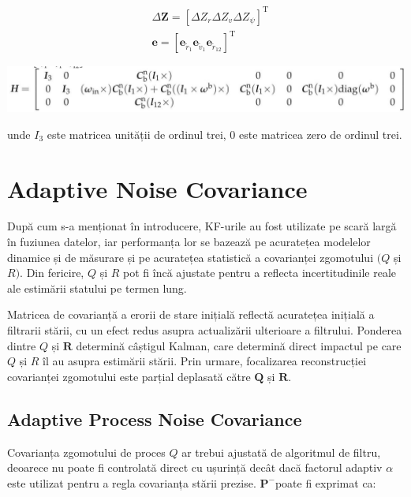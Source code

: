 \documentclass[10pt]{report}
\begin{document}
\begin{equation}
  \begin{aligned}
     & \Delta \mathbf{Z}=\left[\Delta Z_{r} \Delta Z_{v} \Delta Z_{\psi}\right]^{\mathrm{T}}                                                              \\
     & \boldsymbol{e}=\left[\boldsymbol{e}_{\widetilde{r}_{1}} \boldsymbol{e}_{\widetilde{v}_{1}} \boldsymbol{e}_{\widetilde{r}_{12}}\right]^{\mathrm{T}}
  \end{aligned}
\end{equation}


\begin{center}
  \includegraphics[max width=\textwidth]{2023_06_04_c79b87a911fb798e1754g-3}
\end{center}

unde $I_{3}$ este matricea unității de ordinul trei, 0 este matricea zero de ordinul trei.
\section{Adaptive Noise Covariance}
După cum s-a menționat în introducere, KF-urile au fost utilizate pe scară largă în fuziunea datelor, iar performanța lor se bazează pe acuratețea modelelor dinamice și de măsurare și pe acuratețea statistică a covarianței zgomotului $(Q$ și $R)$. Din fericire, $Q$ și $R$ pot fi încă ajustate pentru a reflecta incertitudinile reale ale estimării statului pe termen lung.

Matricea de covarianță a erorii de stare inițială reflectă acuratețea inițială a filtrarii stării, cu un efect redus asupra actualizării ulterioare a filtrului. Ponderea dintre $Q$ și $\boldsymbol{R}$ determină câștigul Kalman, care determină direct impactul pe care $Q$ și $R$ îl au asupra estimării stării. Prin urmare, focalizarea reconstrucției covarianței zgomotului este parțial deplasată către $\boldsymbol{Q}$ și $\boldsymbol{R}$.
\subsection*{Adaptive Process Noise Covariance}
Covarianța zgomotului de proces $Q$ ar trebui ajustată de algoritmul de filtru, deoarece nu poate fi controlată direct cu ușurință decât dacă factorul adaptiv $\alpha$ este utilizat pentru a regla covarianța stării prezise. $\boldsymbol{P}^{-}$poate fi exprimat ca:
\end{document}
